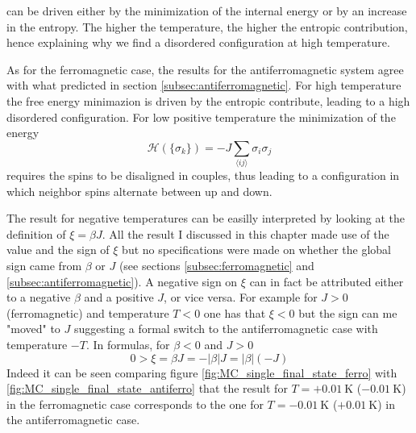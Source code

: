 can be driven either by the minimization of the internal energy or by an increase in the entropy. The higher the temperature, the higher the entropic contribution, hence explaining why 
we find a disordered configuration at high temperature. \par
\vspace{10pt}
As for the ferromagnetic case, the results for the antiferromagnetic system agree with what predicted in section \ref{subsec:antiferromagnetic}. For high temperature the free energy minimazion is driven by the entropic contribute, leading to a high disordered configuration. 
For low positive temperature the minimization of the energy 
\begin{equation*}
    \mathcal{H}(\{\sigma_k\}) = -J \sum_{\langle i j\rangle}\sigma_{i} \sigma_{j}
\end{equation*}
requires the spins to be disaligned in couples, thus leading to a configuration in which neighbor spins alternate between up and down. \par
\vspace{10pt}
The result for negative temperatures can be easilly interpreted by looking at the definition of $\xi = \beta J$. All the result I discussed in this chapter made use of the value and the sign of $\xi$ but no specifications were made on whether the global sign came from $\beta$ or $J$ (see sections \ref{subsec:ferromagnetic} and \ref{subsec:antiferromagnetic}). A negative sign on $\xi$ can in fact be attributed either to 
a negative $\beta$ and a positive $J$, or vice versa. For example for $J>0$ (ferromagnetic) and temperature $T<0$ one has that $\xi < 0$ but the sign can me "moved" to $J$ suggesting a formal switch to the antiferromagnetic case with temperature $-T$. In formulas, for $\beta < 0$ and $J > 0$
\begin{equation*}
    0 > \xi = \beta J = -|\beta| J = |\beta| (-J)
\end{equation*}
Indeed it can be seen comparing figure \ref{fig:MC_single_final_state_ferro} with \ref{fig:MC_single_final_state_antiferro} that the result for $T = +\SI{0.01}{\kelvin}$ ($-\SI{0.01}{\kelvin}$) in the ferromagnetic case corresponds to the one for $T = - \SI{0.01}{\kelvin}$ ($+\SI{0.01}{\kelvin}$) in the antiferromagnetic case.

